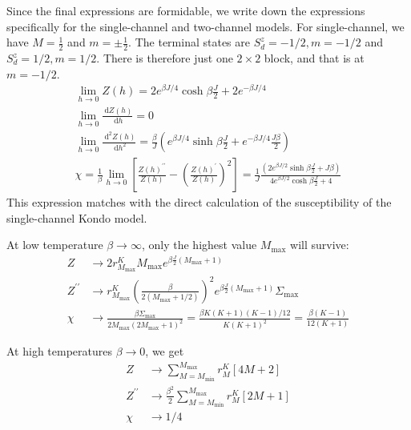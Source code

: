 \documentclass{revtex4-2}
\numberwithin{equation}{section}
\begin{document}
Since the final expressions are formidable, we write down the expressions specifically for the single-channel and two-channel models. For single-channel, we have \(M=\frac{1}{2}\) and \(m = \pm \frac{1}{2}\). The terminal states are \(S_d^z=-1/2, m=-1/2\) and \(S_d^z=1/2, m=1/2\). There is therefore just one \(2\times 2\) block, and that is at \(m=-1/2\).
\begin{gather}
	\lim_{h \to 0}Z(h) = 2e^{\beta J/4}\cosh \beta \frac{J}{2} + 2e^{-\beta J/4} \\
	\lim_{h \to 0}\frac{\:\mathrm{d}Z(h)}{\:\mathrm{d}h} = 0 \\
	\lim_{h \to 0}\frac{\:\mathrm{d}^2Z(h)}{\:\mathrm{d}h^2} = \frac{\beta}{J}\left(e^{\beta J/4}\sinh \beta\frac{J}{2} + e^{-\beta J/4}\frac{J \beta}{2}\right)\\
	\chi = \frac{1}{\beta}\lim_{h \to 0}\left[\frac{Z(h)^{\prime\prime}}{Z(h)} - \left(\frac{Z(h)^{\prime}}{Z(h)}\right)^2 \right] = \frac{1}{J}\frac{\left(2e^{\beta J/2}\sinh \beta\frac{J}{2} + J \beta\right)}{4e^{\beta J/2}\cosh \beta \frac{J}{2} + 4}
\end{gather}
This expression matches with the direct calculation of the susceptibility of the single-channel Kondo model.

At low temperature \(\beta \to \infty\), only the highest value \(M_\text{max}\) will survive:
\begin{equation}\begin{aligned}
	Z &\to 2 r^K_{M_\text{max}} M_\text{max} e^{\beta \frac{J}{2}(M_\text{max} + 1)}\\
	Z^{\prime \prime} &\to r^K_{M_\text{max}}\left(\frac{\beta }{2(M_\text{max} + 1/2)}\right)^2 e^{\beta \frac{J}{2}(M_\text{max} + 1)}\Sigma_\text{max}\\
	\chi &\to \frac{\beta\Sigma_\text{max}}{2M_\text{max}\left(2M_\text{max}+1\right)^2} = \frac{\beta K(K+1)(K-1)/12}{K(K+1)^2} = \frac{\beta(K-1)}{12(K+1)}
\end{aligned}\end{equation}

At high temperatures \(\beta \to 0\), we get
\begin{equation}\begin{aligned}
	Z &\to \sum_{M=M_\text{min}}^{M_\text{max}}r^K_M\left[4M + 2\right]\\
	Z^{\prime \prime} &\to \frac{\beta^2}{2}\sum_{M=M_\text{min}}^{M_\text{max}}r^K_M\left[2M + 1\right]\\
	\chi &\to 1/4
\end{aligned}\end{equation}
\end{document}
